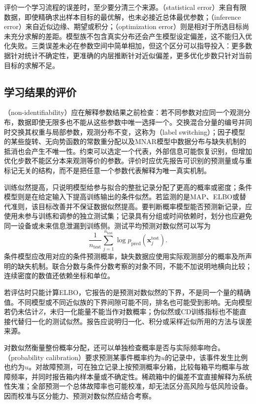 评价一个学习流程的误差时，至少要分清三个来源。（statistical error）来自有限数据，即使精确求出样本目标的最优解，也未必接近总体最优参数；（inference error）来自近似边缘、期望或积分；（optimization error）则是相对于所选目标尚未充分求解的差距。模型族不包含真实分布还会产生模型设定偏差，这不能归入优化失败。三类误差未必在参数空间中简单相加，但这个区分可以指导投入：更多数据针对统计不确定性，更准确的内层推断针对近似偏差，更多优化步数只针对当前目标的求解不足。

\subsection{学习结果的评价}
\label{sec:pgm-parameter-learning-evaluation}

（non-identifiability）应在解释参数结果之前检查：若不同参数对应同一个观测分布，数据即使无限多也不能从这些参数中唯一选择一个。交换混合分量的编号并同时交换其权重与局部参数，观测分布不变，这称为（label switching）；因子模型的某些旋转、无向势函数的常数重分配以及MNAR模型中数据分布与缺失机制的抵消也会产生不唯一性。约束可以选定一个代表，外部信息可能恢复识别，但增加优化步数不能区分本来观测等价的参数。评价时应优先报告可识别的预测量或与重标记无关的结构，而不是把任意一个参数代表解释为唯一真实机制。

训练似然提高，只说明模型给参与拟合的整批记录分配了更高的概率或密度；条件模型则是在给定输入下提高训练输出的条件似然。若监测的是MAP、ELBO或替代准则，该目标改善并不保证数据似然提高。要判断概率模型能否预测新记录，应使用未参与训练和调参的独立测试集；记录具有分组或时间依赖时，划分也应避免同一设备或未来信息泄漏到训练侧。测试平均预测对数似然可以写为
\[
  \frac{1}{n_{\mathrm{test}}}
  \sum_{j=1}^{n_{\mathrm{test}}}
    \log p_{\mathrm{pred}}(\bm{x}^{\mathrm{test}}_j).
\]
条件模型应改用对应的条件预测概率，缺失数据应使用实际观测部分的概率及所声明的缺失机制。联合分数与条件分数考察的对象不同，不能不加说明地横向比较；连续密度的数值还依赖坐标和单位。

若评估时只能计算ELBO，它报告的是预测对数似然的下界，不是同一个量的精确值。不同模型或不同近似族的下界间隙可能不同，排名也可能受到影响。无向模型若仍未估计$Z$，未归一化能量不能当作对数概率；伪似然或CD训练指标也不能直接代替归一化的测试似然。报告应说明归一化、积分或采样近似所用的方法与误差来源。

对数似然衡量整份概率分配，还可以单独检查概率是否与实际频率吻合。（probability calibration）要求预测某事件概率约为$u$的记录中，该事件发生比例也约为$u$。对故障预测，可在独立记录上按预测概率分箱，比较每箱平均概率与故障频率，并同时报告箱内样本量或不确定性。稀疏箱中的偏差不宜直接解释为系统性失准；全部预测一个总体故障率也可能校准，却无法区分高风险与低风险设备。因而校准与区分能力、预测对数似然应结合考察。

